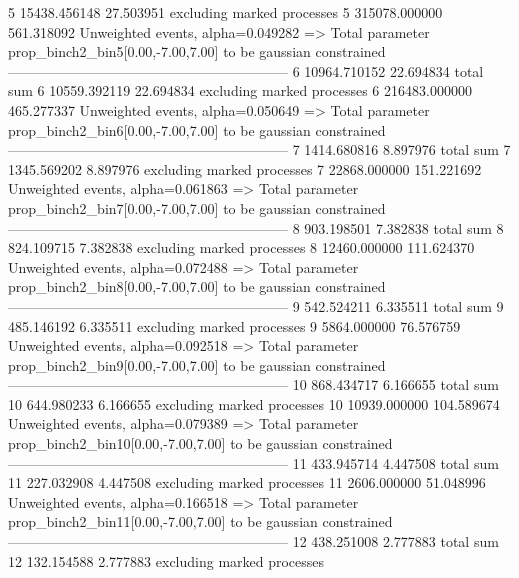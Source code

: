 5          15438.456148    27.503951       excluding marked processes    
5          315078.000000   561.318092      Unweighted events, alpha=0.049282
  => Total parameter prop_binch2_bin5[0.00,-7.00,7.00] to be gaussian constrained
------------------------------------------------------------
6          10964.710152    22.694834       total sum                     
6          10559.392119    22.694834       excluding marked processes    
6          216483.000000   465.277337      Unweighted events, alpha=0.050649
  => Total parameter prop_binch2_bin6[0.00,-7.00,7.00] to be gaussian constrained
------------------------------------------------------------
7          1414.680816     8.897976        total sum                     
7          1345.569202     8.897976        excluding marked processes    
7          22868.000000    151.221692      Unweighted events, alpha=0.061863
  => Total parameter prop_binch2_bin7[0.00,-7.00,7.00] to be gaussian constrained
------------------------------------------------------------
8          903.198501      7.382838        total sum                     
8          824.109715      7.382838        excluding marked processes    
8          12460.000000    111.624370      Unweighted events, alpha=0.072488
  => Total parameter prop_binch2_bin8[0.00,-7.00,7.00] to be gaussian constrained
------------------------------------------------------------
9          542.524211      6.335511        total sum                     
9          485.146192      6.335511        excluding marked processes    
9          5864.000000     76.576759       Unweighted events, alpha=0.092518
  => Total parameter prop_binch2_bin9[0.00,-7.00,7.00] to be gaussian constrained
------------------------------------------------------------
10         868.434717      6.166655        total sum                     
10         644.980233      6.166655        excluding marked processes    
10         10939.000000    104.589674      Unweighted events, alpha=0.079389
  => Total parameter prop_binch2_bin10[0.00,-7.00,7.00] to be gaussian constrained
------------------------------------------------------------
11         433.945714      4.447508        total sum                     
11         227.032908      4.447508        excluding marked processes    
11         2606.000000     51.048996       Unweighted events, alpha=0.166518
  => Total parameter prop_binch2_bin11[0.00,-7.00,7.00] to be gaussian constrained
------------------------------------------------------------
12         438.251008      2.777883        total sum                     
12         132.154588      2.777883        excluding marked processes    
